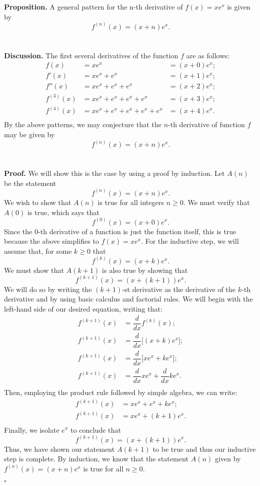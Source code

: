 \documentclass[12pt]{exam}
\begin{document}
\begin{questions}
\question
\textbf{Proposition.} A general pattern for the n-th derivative of $f(x) = xe^x$ is given by $$f^{(n)} (x) = (x+n)e^x.$$
\\
\\\textbf{Discussion.} The first several derivatives of the function $f$ are as follows:
\begin{align*}
f (x) &= xe^x &= (x+0)e^x ;\\
f' (x) &= xe^x +e^x &= (x+1)e^x ;\\
f'' (x)&= xe^x +e^x  +e^x  &= (x+2)e^x ;\\
f^{(3)} (x)&= xe^x +e^x  +e^x  +e^x  &= (x+3)e^x ;\\
f^{(4)} (x) &= xe^x +e^x  +e^x  +e^x  +e^x  &= (x+4)e^x .\\
\end{align*}
By the above patterns, we may conjecture that the $n$-th derivative of function $f$ may be given by $$f^{(n)} (x) = (x+n)e^x.$$
\\
\\\textbf{Proof.} We will show this is the case by using a proof by induction. Let $A(n)$ be the statement $$f^{(n)} (x) = (x+n)e^x.$$ We wish to show that $A(n)$ is true for all integers $n \geq 0$. We must verify that $A(0)$ is true, which says that  $$f^{(0)} (x) = (x+0)e^x.$$ Since the 0-th derivative of a function is just the function itself, this is true because the above simplifies to $f(x) = xe^x$. For the inductive step, we will assume that, for some $k\geq0$ that $$f^{(k)} (x) = (x+k)e^x.$$ We must show that $A(k+1)$ is also true by showing that  $$f^{(k+1)} (x) = (x+(k+1))e^x.$$ We will do so by writing the $(k+1)$-st derivative as the derivative of the $k$-th derivative and by using basic calculus and factorial rules. We will begin with the left-hand side of our desired equation, writing that:
\begin{align*}
f^{(k+1)} (x) &= \dfrac{d}{dx} f^{(k)} (x);\\
f^{(k+1)} (x) &= \dfrac{d}{dx} \Big[ (x+k)e^x \Big];\\
f^{(k+1)} (x) &= \dfrac{d}{dx} \Big[ xe^x +ke^x \Big];\\
f^{(k+1)} (x) &= \dfrac{d}{dx} xe^x + \dfrac{d}{dx} ke^x .\\
\end{align*}
Then, employing the product rule followed by simple algebra, we can write:
\begin{align*}
f^{(k+1)} (x) &=xe^x +e^x + ke^x ;\\
f^{(k+1)} (x) &=xe^x +(k+1)e^x .\\
\end{align*}
Finally, we isolate $e^x$ to conclude that 
\begin{equation*}
f^{(k+1)} (x) =(x+(k+1))e^x.
\end{equation*}
Thus, we have shown our statement $A(k+1)$ to be true and thus our inductive step is complete. By induction, we know that the statement $A(n)$ given by $f^{(n)} (x) = (x+n)e^x$ is true for all $n \geq 0$.
\begin{flushright}
$\square$
\end{flushright}


\end{questions}
\end{document}

